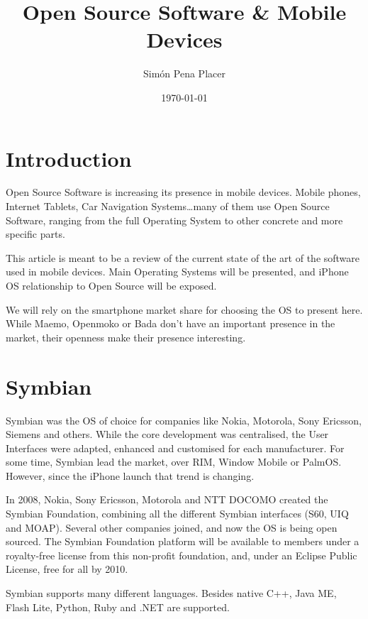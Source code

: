\documentclass[12pt]{article}
\title{Open Source Software \& Mobile Devices}
\author{Sim\'on Pena Placer}
\date{\today}
\begin{document}
\maketitle

\section{Introduction}
	Open Source Software is increasing its presence in mobile devices. Mobile phones, Internet Tablets, Car Navigation Systems\dots many of them use Open Source Software, ranging from the full Operating System to other concrete and more specific parts.

	This article is meant to be a review of the current state of the art of the software used in mobile devices. Main Operating Systems will be presented, and iPhone OS relationship to Open Source will be exposed. 

	We will rely on the smartphone market share for choosing the OS to present here. While Maemo, Openmoko or Bada don't have an important presence in the market, their openness make their presence interesting.  

\section{Symbian}

	Symbian was the OS of choice for companies like Nokia, Motorola, Sony Ericsson, Siemens and others\cite{symbian:old-members}. While the core development was centralised, the User Interfaces were adapted, enhanced and customised for each manufacturer\cite{wiki:symbian}. For some time, Symbian lead the market, over RIM, Window Mobile or PalmOS. However, since the iPhone launch that trend is changing\cite{market:admob,market:gartner,market:canalys1, market:canalys2}.

	In 2008, Nokia, Sony Ericsson, Motorola and NTT DOCOMO created the Symbian Foundation\cite{xatakamovil:symbian}, combining all the different Symbian interfaces (S60, UIQ and MOAP). Several other companies joined\cite{symbian:current-members}, and now the OS is being open sourced. The Symbian Foundation platform will be available to members under a royalty-free license from this non-profit foundation, and, under an Eclipse Public License, free for all by 2010\cite{symbian:license}.

Symbian supports many different languages. Besides native C++, Java ME, Flash Lite, Python, Ruby and .NET are supported\cite{symbian:developing}.
\end{document}
